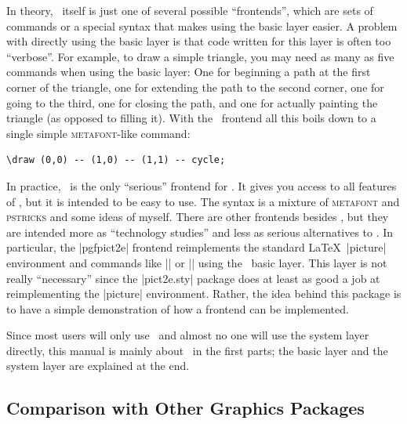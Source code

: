 In theory, \tikzname\ itself is just one of several possible ``frontends'',
which are sets of commands or a special syntax that makes using the basic layer
easier. A problem with directly using the basic layer is that code written for
this layer is often too ``verbose''. For example, to draw a simple triangle,
you may need as many as five commands when using the basic layer: One for
beginning a path at the first corner of the triangle, one for extending the
path to the second corner, one for going to the third, one for closing the
path, and one for actually painting the triangle (as opposed to filling it).
With the \tikzname\ frontend all this boils down to a single simple
\textsc{metafont}-like command:
%
\begin{verbatim}
\draw (0,0) -- (1,0) -- (1,1) -- cycle;
\end{verbatim}

In practice, \tikzname\ is the only ``serious'' frontend for \pgfname. It gives
you access to all features of \pgfname, but it is intended to be easy to use.
The syntax is a mixture of \textsc{metafont} and \textsc{pstricks} and some
ideas of myself. There are other frontends besides \tikzname, but they are intended
more as ``technology studies'' and less as serious alternatives to
\tikzname. In particular, the |pgfpict2e| frontend   reimplements the standard
\LaTeX\ |{picture}|  environment and commands like |\line| or |\vector| using
the \pgfname\ basic layer. This layer is not really ``necessary'' since the
|pict2e.sty| package does at least as good a job at reimplementing the
|{picture}| environment. Rather, the idea behind this package is to have a
simple demonstration of how a frontend can be implemented.

Since most users will only use \tikzname\ and almost no one will use the system
layer directly, this manual is mainly about \tikzname\ in the first parts; the
basic layer and the system layer are explained at the end.


\subsection{Comparison with Other Graphics Packages}

